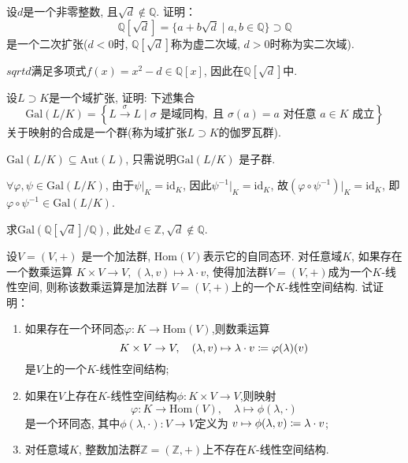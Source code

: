 \begin{problem}
    设$d$是一个非零整数, 且$\sqrt d \notin \mathbb{Q}$. 证明：
\[
    \mathbb{Q}[\sqrt{d}] = \{a + b\sqrt{d} \mid a, b \in \mathbb{Q}\} \supset \mathbb{Q}
\]
是一个二次扩张($d < 0$时, $\mathbb{Q}[\sqrt{d}]$称为虚二次域, $d > 0$时称为实二次域).
\end{problem}

\begin{solution}
    $sqrt{d}$满足多项式$f(x) = x^2 - d \in \mathbb{Q}[x]$,
    因此在$\mathbb{Q}[\sqrt{d}]$中.
\end{solution}

\begin{problem}
    设$L \supset K$是一个域扩张, 证明: 下述集合
\[
\mathrm{Gal}(L/K)=
\left\{L \xrightarrow{\sigma} L \mid \sigma\text{ 是域同构},\text{ 且 } \sigma(a) = a \text{ 对任意 } a \in K \text{ 成立}\right\}
\]
关于映射的合成是一个群(称为域扩张$L\supset K$的伽罗瓦群).
\end{problem}

\begin{solution}
    $\mathrm{Gal}(L/K) \subseteq \mathrm{Aut}(L)$, 只需说明$\mathrm{Gal}(L/K)$
是子群.

    $\forall \varphi, \psi \in \mathrm{Gal}(L/K)$, 由于$\psi|_K = \mathrm{id}_K$,
因此$\psi^{-1}|_K = \mathrm{id}_K$, 故$(\varphi \circ \psi^{-1})|_K = \mathrm{id}_K$,
即$\varphi \circ \psi^{-1} \in \mathrm{Gal}(L/K)$.
\end{solution}

\begin{problem}
    求$\mathrm{Gal}\left(\mathbb{Q}[\sqrt{d}]/\mathbb{Q}\right)$,
此处$d \in \mathbb{Z}, \sqrt{d} \notin \mathbb{Q}$.
\end{problem}

\begin{solution}
    
\end{solution}

\begin{problem}
    设$V = (V, +)$ 是一个加法群, $\mathrm{Hom}(V)$表示它的自同态环.
对任意域$K$, 如果存在一个数乘运算
$K \times V \to V,\, (\lambda,v) \mapsto \lambda \cdot v$,
使得加法群$V = (V, +)$成为一个$K$-线性空间, 则称该数乘运算是加法群
$V = (V, +)$上的一个$K$-线性空间结构. 试证明：
\begin{enumerate}[(1)]
    \item 如果存在一个环同态$\varphi:K \to \mathrm{Hom}(V)$,则数乘运算
\[
    K \times V \to V,\quad (\lambda, v) \mapsto \lambda \cdot v \mathrel{\coloneqq} \varphi(\lambda)(v)
\]
是$V$上的一个$K$-线性空间结构;
    \item 如果在$V$上存在$K$-线性空间结构$\phi:K \times V \to V$,则映射
\[
    \varphi:K \to \mathrm{Hom}(V),\quad \lambda \mapsto \phi(\lambda, \cdot)
\]
是一个环同态, 其中$\phi(\lambda, \cdot):V \to V$定义为
$v \mapsto \phi(\lambda, v) \mathrel{\coloneqq} \lambda \cdot v$;
    \item 对任意域$K$, 整数加法群$\mathbb{Z} = (\mathbb{Z}, +)$上不存在$K$-线性空间结构.
\end{enumerate}
\end{problem}

